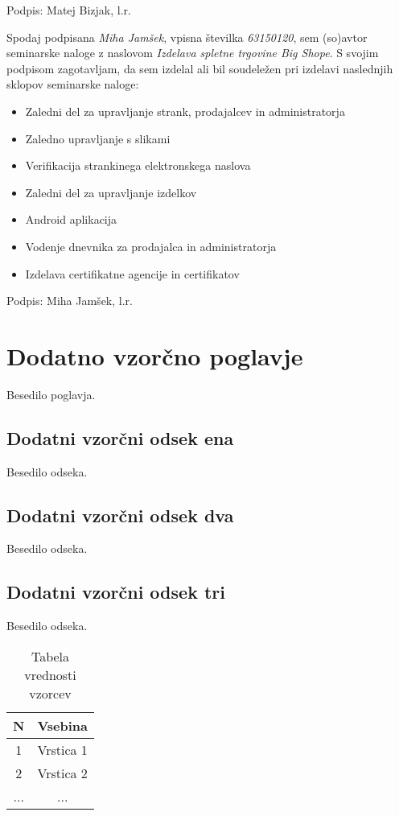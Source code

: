 \documentclass[a4paper,12pt]{report}
\newcommand{\naslov}     {Izdelava spletne trgovine Big Shope}
\newcommand{\drugiavtor} {Matej Bizjak}
\newcommand{\tretjiavtor} {Miha Jamšek}
\newcommand{\tretjiindeks}{63150120}
\begin{document}
Podpis: {\drugiavtor}, l.r.

\newpage

Spodaj podpisana \textit{\tretjiavtor}, vpisna številka \textit{\tretjiindeks}, sem (so)avtor seminarske naloge z naslovom \textit{\naslov}. S svojim podpisom zagotavljam, da sem izdelal ali bil soudeležen pri izdelavi naslednjih sklopov seminarske naloge:
\begin{itemize}
    \item Zaledni del za upravljanje strank, prodajalcev in administratorja
    \item Zaledno upravljanje s slikami
    \item Verifikacija strankinega elektronskega naslova
    \item Zaledni del za upravljanje izdelkov
    \item Android aplikacija
    \item Vodenje dnevnika za prodajalca in administratorja
    \item Izdelava certifikatne agencije in certifikatov
\end{itemize}

Podpis: {\tretjiavtor}, l.r.

\chapter{Dodatno vzorčno poglavje}

Besedilo poglavja.

\section{Dodatni vzorčni odsek ena}

Besedilo odseka.

\section{Dodatni vzorčni odsek dva}

Besedilo odseka.

\section{Dodatni vzorčni odsek tri}

Besedilo odseka.

\begin{table}[htb]
 \centering
 \begin{tabular}{c || c}
  \textbf{N} & Vsebina\\ \hline\hline
  1 & Vrstica 1\\        \hline
  2 & Vrstica 2\\        \hline
  ... & ... \\
\end{tabular}
\caption{Tabela vrednosti vzorcev}
\label{tab:1}
\end{table}
\end{document}
